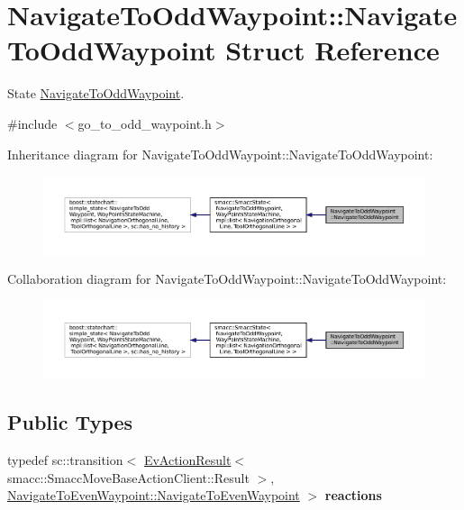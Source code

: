 \hypertarget{structNavigateToOddWaypoint_1_1NavigateToOddWaypoint}{}\section{Navigate\+To\+Odd\+Waypoint\+:\+:Navigate\+To\+Odd\+Waypoint Struct Reference}
\label{structNavigateToOddWaypoint_1_1NavigateToOddWaypoint}


State \hyperlink{structNavigateToOddWaypoint_1_1NavigateToOddWaypoint}{Navigate\+To\+Odd\+Waypoint}.  




{\ttfamily \#include $<$go\+\_\+to\+\_\+odd\+\_\+waypoint.\+h$>$}



Inheritance diagram for Navigate\+To\+Odd\+Waypoint\+:\+:Navigate\+To\+Odd\+Waypoint\+:
\nopagebreak
\begin{figure}[H]
\begin{center}
\leavevmode
\includegraphics[width=350pt]{structNavigateToOddWaypoint_1_1NavigateToOddWaypoint__inherit__graph}
\end{center}
\end{figure}


Collaboration diagram for Navigate\+To\+Odd\+Waypoint\+:\+:Navigate\+To\+Odd\+Waypoint\+:
\nopagebreak
\begin{figure}[H]
\begin{center}
\leavevmode
\includegraphics[width=350pt]{structNavigateToOddWaypoint_1_1NavigateToOddWaypoint__coll__graph}
\end{center}
\end{figure}
\subsection*{Public Types}
\begin{DoxyCompactItemize}
\item 
\mbox{\label{structNavigateToOddWaypoint_1_1NavigateToOddWaypoint_a23bbe6ff0cf5fedf9db62498a75e0cea}} 
typedef sc\+::transition$<$ \hyperlink{structsmacc_1_1EvActionResult}{Ev\+Action\+Result}$<$ smacc\+::\+Smacc\+Move\+Base\+Action\+Client\+::\+Result $>$, \hyperlink{structNavigateToEvenWaypoint_1_1NavigateToEvenWaypoint}{Navigate\+To\+Even\+Waypoint\+::\+Navigate\+To\+Even\+Waypoint} $>$ {\bfseries reactions}
\end{DoxyCompactItemize}
